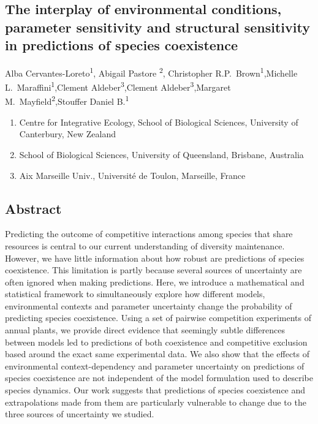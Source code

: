 \begin{refsection}
\chapter{The interplay of environmental conditions, parameter sensitivity and structural sensitivity in predictions of species coexistence} %
\label{Bayesian_competition}

\noindent Alba Cervantes-Loreto\textsuperscript{1}, Abigail Pastore \textsuperscript{2}, Christopher R.P.\ Brown\textsuperscript{1},Michelle L.\ Maraffini\textsuperscript{1},Clement Aldeber\textsuperscript{3},Clement Aldeber\textsuperscript{3},Margaret M.\ Mayfield\textsuperscript{2},Stouffer Daniel B.\textsuperscript{1}

\begin{enumerate}
    \item Centre for Integrative Ecology, School of Biological Sciences, University of Canterbury, New Zealand
    \item School of Biological Sciences, University of Queensland, Brisbane, Australia
    \item Aix Marseille Univ., Université de Toulon,  Marseille, France
\end{enumerate}

\end{refsection}
\section*{Abstract}


Predicting the outcome of competitive interactions among species that share resources is central to our current understanding of diversity maintenance. However, we have little information about how robust are predictions of species coexistence. This limitation is partly because several sources of uncertainty are often ignored when making predictions. Here, we introduce a mathematical and statistical framework to simultaneously explore how different models, environmental contexts and parameter uncertainty change the probability of predicting species coexistence.  Using a set of pairwise competition experiments of annual plants, we provide direct evidence that seemingly subtle differences between models led to predictions of both coexistence and competitive exclusion based around the exact same experimental data. We also show that the effects of environmental context-dependency and parameter uncertainty on predictions of species coexistence are not independent of the model formulation used to describe species dynamics. Our work suggests that predictions of species coexistence and extrapolations made from them are particularly vulnerable to change due to the three sources of uncertainty we studied.

